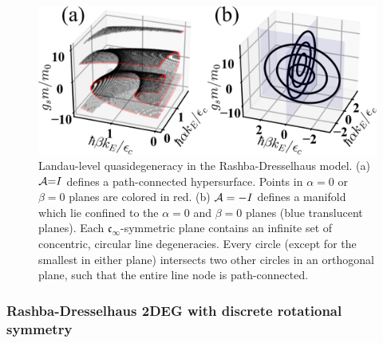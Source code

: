 \documentclass[aps, showpacs, twocolumn, notitlepage, superscriptaddress]{revtex4-1}
\begin{document}
\begin{figure}
\includegraphics[width=1.0\columnwidth]{dgn.png}
\caption{Landau-level quasidegeneracy in the Rashba-Dresselhaus model. (a)  ${\cal A}{=}I$ defines a path-connected hypersurface. Points in $\alpha=0$ or $\beta=0$ planes are colored in red. (b)  ${\cal A}=-I$ defines a manifold which lie confined to  the $\alpha{=}0$ and $\beta{=}0$ planes (blue translucent planes). Each $\mathfrak{c}_{\infty}$-symmetric plane contains an infinite set of concentric, circular line degeneracies. Every circle (except for the smallest in either plane)  intersects two other circles in an orthogonal plane, such that the entire line node is path-connected. \label{fig:dgn}}
\end{figure}

\subsubsection{Rashba-Dresselhaus 2DEG with discrete rotational symmetry}\label{sec:disrot}
\end{document}

